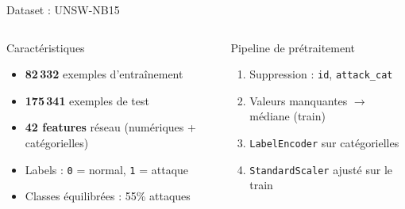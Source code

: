 \documentclass[aspectratio=169,11pt]{beamer}
\begin{document}
\begin{frame}{Dataset : UNSW-NB15}
\begin{columns}[T]
\begin{exampleblock}{Caract\'eristiques}
\begin{itemize}
    \item \textbf{82\,332} exemples d'entra\^inement
    \item \textbf{175\,341} exemples de test
    \item \textbf{42 features} r\'eseau (num\'eriques + cat\'egorielles)
    \item Labels : \texttt{0} = normal, \texttt{1} = attaque
    \item Classes \'equilibr\'ees : 55\% attaques
\end{itemize}
\end{exampleblock}

\begin{block}{Pipeline de pr\'etraitement}
\begin{enumerate}\setlength\itemsep{3pt}
    \item Suppression : \texttt{id}, \texttt{attack\_cat}
    \item Valeurs manquantes $\rightarrow$ m\'ediane (train)
    \item \texttt{LabelEncoder} sur cat\'egorielles
    \item \texttt{StandardScaler} ajust\'e sur le train
\end{enumerate}
\end{block}
\end{columns}
\end{frame}
\end{document}
